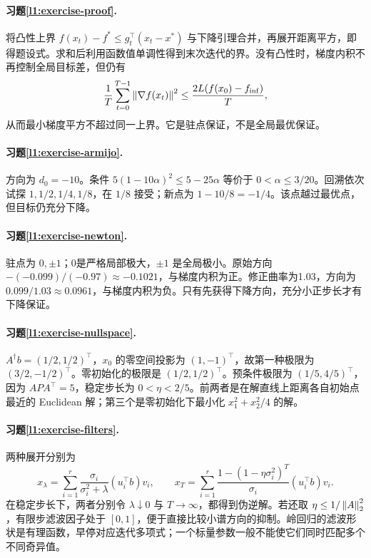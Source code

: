 \paragraph{习题\ref{l1:exercise-proof}.}
将凸性上界 $f(x_t)-f^*\leq g_t^\top(x_t-x^*)$ 与下降引理合并，再展开距离平方，即得题设式。求和后利用函数值单调性得到末次迭代的界。没有凸性时，梯度内积不再控制全局目标差，但仍有
\[
 \frac1T\sum_{t=0}^{T-1}\left\lVert\nabla f(x_t)\right\rVert^2
 \leq\frac{2L(f(x_0)-f_{\inf})}{T},
\]
从而最小梯度平方不超过同一上界。它是驻点保证，不是全局最优保证。

\paragraph{习题\ref{l1:exercise-armijo}.}
方向为 $d_0=-10$。条件 $5(1-10\alpha)^2\leq5-25\alpha$ 等价于 $0<\alpha\leq3/20$。回溯依次试探 $1,1/2,1/4,1/8$，在 $1/8$ 接受；新点为 $1-10/8=-1/4$。该点越过最优点，但目标仍充分下降。

\paragraph{习题\ref{l1:exercise-newton}.}
驻点为 $0,\pm1$；0是严格局部极大，$\pm1$ 是全局极小。原始方向 $-(-0.099)/(-0.97)\approx-0.1021$，与梯度内积为正。修正曲率为1.03，方向为 $0.099/1.03\approx0.0961$，与梯度内积为负。只有先获得下降方向，充分小正步长才有下降保证。

\paragraph{习题\ref{l1:exercise-nullspace}.}
$A^\dagger b=(1/2,1/2)^\top$，$x_0$ 的零空间投影为 $(1,-1)^\top$，故第一种极限为 $(3/2,-1/2)^\top$。零初始化的极限是 $(1/2,1/2)^\top$。预条件极限为 $(1/5,4/5)^\top$，因为 $APA^\top=5$，稳定步长为 $0<\eta<2/5$。前两者是在解直线上距离各自初始点最近的 Euclidean 解；第三个是零初始化下最小化 $x_1^2+x_2^2/4$ 的解。

\paragraph{习题\ref{l1:exercise-filters}.}
两种展开分别为
\[
 x_\lambda=\sum_{i=1}^r\frac{\sigma_i}{\sigma_i^2+\lambda}
                 (u_i^\top b)v_i,
\qquad
 x_T=\sum_{i=1}^r
 \frac{1-(1-\eta\sigma_i^2)^T}{\sigma_i}(u_i^\top b)v_i.
\]
在稳定步长下，两者分别令 $\lambda\downarrow0$ 与 $T\to\infty$，都得到伪逆解。若还取 $\eta\leq1/\left\lVert A\right\rVert_2^2$，有限步滤波因子处于 $[0,1]$，便于直接比较小谱方向的抑制。岭回归的滤波形状是有理函数，早停对应迭代多项式；一个标量参数一般不能使它们同时匹配多个不同奇异值。

